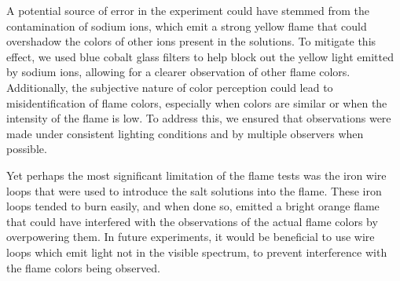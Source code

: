 \documentclass[11pt]{article}
\begin{document}
A potential source of error in the experiment could have stemmed from the contamination of sodium ions, which emit a strong yellow flame that could overshadow the colors of other ions present in the solutions. To mitigate this effect, we used blue cobalt glass filters to help block out the yellow light emitted by sodium ions, allowing for a clearer observation of other flame colors. Additionally, the subjective nature of color perception could lead to misidentification of flame colors, especially when colors are similar or when the intensity of the flame is low. To address this, we ensured that observations were made under consistent lighting conditions and by multiple observers when possible.

Yet perhaps the most significant limitation of the flame tests was the iron wire loops that were used to introduce the salt solutions into the flame. These iron loops tended to burn easily, and when done so, emitted a bright orange flame that could have interfered with the observations of the actual flame colors by overpowering them. In future experiments, it would be beneficial to use wire loops which emit light not in the visible spectrum, to prevent interference with the flame colors being observed.
\end{document}
